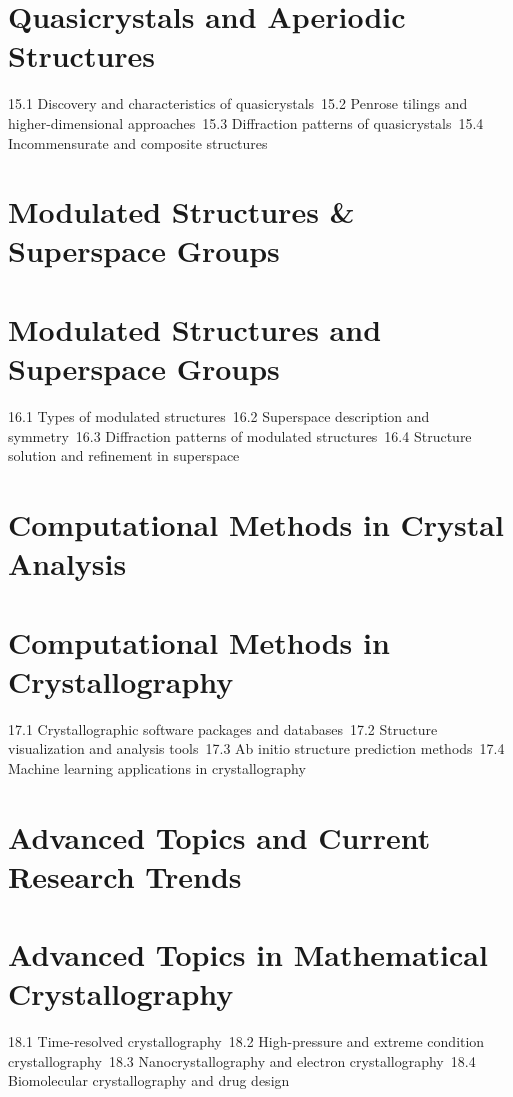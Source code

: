 \section{Quasicrystals and Aperiodic Structures}
15.1 Discovery and characteristics of quasicrystals\
15.2 Penrose tilings and higher-dimensional approaches\
15.3 Diffraction patterns of quasicrystals\
15.4 Incommensurate and composite structures\
\section{Modulated Structures \& Superspace Groups}
\section{Modulated Structures and Superspace Groups}
16.1 Types of modulated structures\
16.2 Superspace description and symmetry\
16.3 Diffraction patterns of modulated structures\
16.4 Structure solution and refinement in superspace\
\section{Computational Methods in Crystal Analysis}
\section{Computational Methods in Crystallography}
17.1 Crystallographic software packages and databases\
17.2 Structure visualization and analysis tools\
17.3 Ab initio structure prediction methods\
17.4 Machine learning applications in crystallography\
\section{Advanced Topics and Current Research Trends}
\section{Advanced Topics in Mathematical Crystallography}
18.1 Time-resolved crystallography\
18.2 High-pressure and extreme condition crystallography\
18.3 Nanocrystallography and electron crystallography\
18.4 Biomolecular crystallography and drug design\
